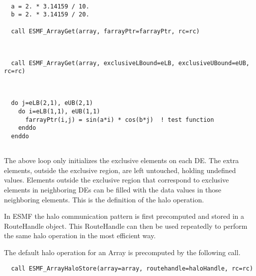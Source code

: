  \begin{verbatim}

  a = 2. * 3.14159 / 10.
  b = 2. * 3.14159 / 20.
  
  call ESMF_ArrayGet(array, farrayPtr=farrayPtr, rc=rc)
 
\end{verbatim}
 

 \begin{verbatim}
  
  call ESMF_ArrayGet(array, exclusiveLBound=eLB, exclusiveUBound=eUB, rc=rc)
 
\end{verbatim}
 

 \begin{verbatim}
  
  do j=eLB(2,1), eUB(2,1)
    do i=eLB(1,1), eUB(1,1)
      farrayPtr(i,j) = sin(a*i) * cos(b*j)  ! test function
    enddo
  enddo
 
\end{verbatim}
 

   The above loop only initializes the exclusive elements on each DE. The extra
   elements, outside the exclusive region, are left untouched, holding undefined
   values. Elements outside the exclusive region that correspond to 
   exclusive elements in neighboring DEs can be filled with the data values 
   in those neighboring elements. This is the definition of the halo operation.
  
   In ESMF the halo communication pattern is first precomputed and stored in
   a RouteHandle object. This RouteHandle can then be used repeatedly to 
   perform the same halo operation in the most efficient way.
  
   The default halo operation for an Array is precomputed by the following call. 

 \begin{verbatim}
  call ESMF_ArrayHaloStore(array=array, routehandle=haloHandle, rc=rc)
 
\end{verbatim}
 

